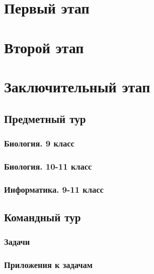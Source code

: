 \documentclass[a4paper,12pt,oneside]{book}
\begin{document}

\setcounter{tocdepth}{1}

\tableofcontents

\part{Первый этап}
\clearpage 




\part{Второй этап}
\clearpage




\part{Заключительный этап}

\clearpage
\chapter{Предметный тур}

\section{Биология. 9 класс}


\section{Биология. 10-11 класс}


\section{Информатика. 9-11 класс}


\chapter{Командный тур}

\section{Задачи} 



\section{Приложения к задачам}




\end{document}
